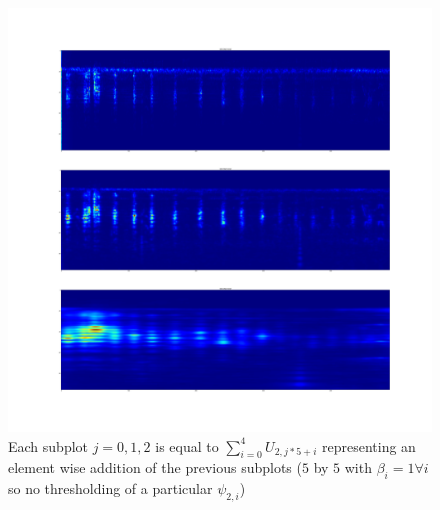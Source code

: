 \documentclass[a4paper]{report}
\begin{document}
\begin{figure}[H]
\begin{center}
\includegraphics[scale=0.1]{RN1017_3.png}\caption{Each subplot $j=0,1,2$ is equal to $\sum_{i=0}^4 U_{2,j*5+i}$ representing an element wise addition of the previous subplots ($5$ by $5$ with $\beta_i=1\forall i$ so no thresholding of a particular $\psi_{2,i}$) }
\end{center}
\end{figure}
\end{document}
